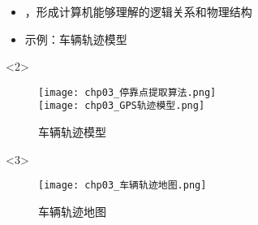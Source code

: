 \begin{frame}[t]{\subsecname}
\begin{itemize}
\item<1-> ，形成计算机能够理解的逻辑关系和物理结构
\item<2-> 示例：车辆轨迹模型 
\end{itemize}

\begin{overlayarea}{\textwidth}{\textheight}
  \begin{onlyenv}<2>
\begin{figure}
  \centering
  \texttt{[image: chp03\_停靠点提取算法.png]} \\
  \texttt{[image: chp03\_GPS轨迹模型.png]}
  \caption{车辆轨迹模型}
\end{figure}
  \end{onlyenv}

\vspace{-15pt}
  \begin{onlyenv}<3>
\begin{figure}
  \centering
  \texttt{[image: chp03\_车辆轨迹地图.png]}
  \caption{车辆轨迹地图}
\end{figure}
  \end{onlyenv}
\end{overlayarea}
\end{frame}

